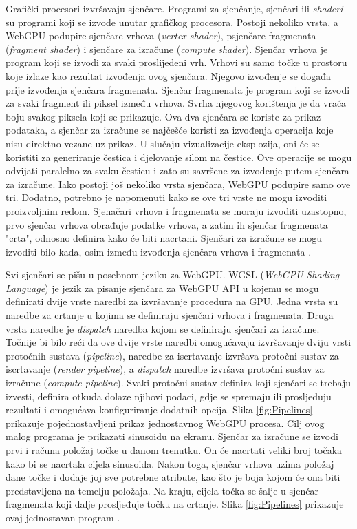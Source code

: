 \documentclass{foi}
\begin{document}
Grafički procesori izvršavaju sjenčare. Programi za sjenčanje, sjenčari ili \textit{shaderi} su programi koji se izvode unutar grafičkog procesora. Postoji nekoliko vrsta, a WebGPU podupire sjenčare vrhova (\textit{vertex shader}), psjenčare fragmenata (\textit{fragment shader}) i sjenčare za izračune (\textit{compute shader}). Sjenčar vrhova je program koji se izvodi za svaki proslijeđeni vrh. Vrhovi su samo točke u prostoru koje izlaze kao rezultat izvođenja ovog sjenčara. Njegovo izvođenje se događa prije izvođenja sjenčara fragmenata. Sjenčar fragmenata je program koji se izvodi za svaki fragment ili piksel između vrhova. Svrha njegovog korištenja je da vraća boju svakog piksela koji se prikazuje. Ova dva sjenčara se koriste za prikaz podataka, a sjenčar za izračune se najčešće koristi za izvođenja operacija koje nisu direktno vezane uz prikaz. U slučaju vizualizacije eksplozija, oni će se koristiti za generiranje čestica i djelovanje silom na čestice. Ove operacije se mogu odvijati paralelno za svaku česticu i zato su savršene za izvođenje putem sjenčara za izračune. Iako postoji još nekoliko vrsta sjenčara, WebGPU podupire samo ove tri. Dodatno, potrebno je napomenuti kako se ove tri vrste ne mogu izvoditi proizvoljnim redom. Sjenačari vrhova i fragmenata se moraju izvoditi uzastopno, prvo sjenčar vrhova obrađuje podatke vrhova, a zatim ih sjenčar fragmenata "crta", odnosno definira kako će biti nacrtani. Sjenčari za izračune se mogu izvoditi bilo kada, osim između izvođenja sjenčara vrhova i fragmenata \parencite{WebGPUFundamentalsFundamentals}.

  
Svi sjenčari se pišu u posebnom jeziku za WebGPU. WGSL (\textit{WebGPU Shading Language}) je jezik za pisanje sjenčara za WebGPU API u kojemu se mogu definirati dvije vrste naredbi za izvršavanje procedura na GPU. Jedna vrsta su naredbe za crtanje u kojima se definiraju sjenčari vrhova i fragmenata. Druga vrsta naredbe je \textit{dispatch} naredba kojom se definiraju sjenčari za izračune. Točnije bi bilo reći da ove dvije vrste naredbi omogućavaju izvršavanje dviju vrsti protočnih sustava (\textit{pipeline}), naredbe za iscrtavanje izvršava protočni sustav za iscrtavanje (\textit{render pipeline}), a \textit{dispatch} naredbe izvršava protočni sustav za izračune (\textit{compute pipeline}). Svaki protočni sustav definira koji sjenčari se trebaju izvesti, definira otkuda dolaze njihovi podaci, gdje se spremaju ili prosljeđuju rezultati i omogućava konfiguriranje dodatnih opcija. Slika \ref{fig:Pipelines} prikazuje pojednostavljeni prikaz jednostavnog WebGPU procesa. Cilj ovog malog programa je prikazati sinusoidu na ekranu. Sjenčar za izračune se izvodi prvi i računa položaj točke u danom trenutku. On će nacrtati veliki broj točaka kako bi se nacrtala cijela sinusoida. Nakon toga, sjenčar vrhova uzima položaj dane točke i dodaje joj sve potrebne atribute, kao što je boja kojom će ona biti predstavljena na temelju položaja. Na kraju, cijela točka se šalje u sjenčar fragmenata koji dalje prosljeđuje točku na crtanje. Slika \ref{fig:Pipelines} prikazuje ovaj jednostavan program \parencite{TourOfWGSL}. 
\end{document}
